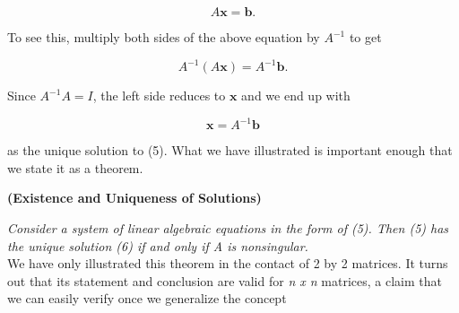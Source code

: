 \documentclass{article}
\begin{document}
\begin{equation}
    A\boldsymbol{x}=\boldsymbol{b}.
\end{equation}

\noindent
To see this, multiply both sides of the above equation by $A^{-1}$ to get

\begin{displaymath}
A^{-1}(A\boldsymbol{x})=A^{-1}\boldsymbol{b}.
\end{displaymath}

\noindent
Since $A^{-1}A = I$, the left side reduces to $\boldsymbol{x}$ and we end up with

\begin{equation}
    \boldsymbol{x}=A^{-1}\boldsymbol{b}
\end{equation}

\noindent
as the unique solution to (5). What we have illustrated is important enough that we state it as a theorem. 

\begin{theorem} \textbf{(Existence and Uniqueness of Solutions)}
\end{theorem}

\noindent 
\textit{Consider a system of linear algebraic equations in the form of (5). Then (5) has the unique solution (6) if and only if A is nonsingular.}  \\

We have only illustrated this theorem in the contact of 2 by 2 matrices. It turns out that its statement and conclusion are valid for \textit{n x n} matrices, a claim that we can easily verify once we generalize the concept
\end{document}
